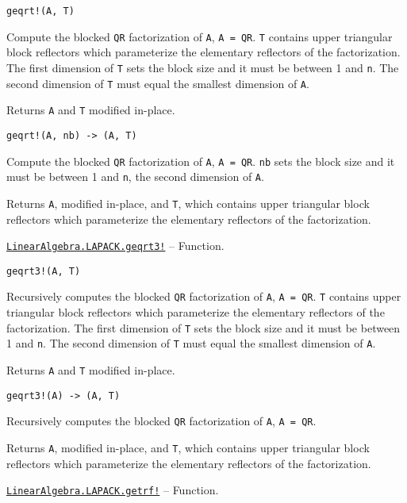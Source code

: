 \begin{adjustwidth}{2em}{0pt}


\begin{verbatim}
geqrt!(A, T)
\end{verbatim}

Compute the blocked \texttt{QR} factorization of \texttt{A}, \texttt{A = QR}. \texttt{T} contains upper triangular block reflectors which parameterize the elementary reflectors of the factorization. The first dimension of \texttt{T} sets the block size and it must be between 1 and \texttt{n}. The second dimension of \texttt{T} must equal the smallest dimension of \texttt{A}.

Returns \texttt{A} and \texttt{T} modified in-place.




\begin{lstlisting}
geqrt!(A, nb) -> (A, T)
\end{lstlisting}

Compute the blocked \texttt{QR} factorization of \texttt{A}, \texttt{A = QR}. \texttt{nb} sets the block size and it must be between 1 and \texttt{n}, the second dimension of \texttt{A}.

Returns \texttt{A}, modified in-place, and \texttt{T}, which contains upper triangular block reflectors which parameterize the elementary reflectors of the factorization.



\end{adjustwidth}
\hypertarget{12471188723051727334}{}
\hyperlink{12471188723051727334}{\texttt{LinearAlgebra.LAPACK.geqrt3!}}  -- {Function.}

\begin{adjustwidth}{2em}{0pt}


\begin{verbatim}
geqrt3!(A, T)
\end{verbatim}

Recursively computes the blocked \texttt{QR} factorization of \texttt{A}, \texttt{A = QR}. \texttt{T} contains upper triangular block reflectors which parameterize the elementary reflectors of the factorization.  The first dimension of \texttt{T} sets the block size and it must be between 1 and \texttt{n}. The second dimension of \texttt{T} must equal the smallest dimension of \texttt{A}.

Returns \texttt{A} and \texttt{T} modified in-place.




\begin{lstlisting}
geqrt3!(A) -> (A, T)
\end{lstlisting}

Recursively computes the blocked \texttt{QR} factorization of \texttt{A}, \texttt{A = QR}.

Returns \texttt{A}, modified in-place, and \texttt{T}, which contains upper triangular block reflectors which parameterize the elementary reflectors of the factorization.



\end{adjustwidth}
\hypertarget{2351778938398249720}{}
\hyperlink{2351778938398249720}{\texttt{LinearAlgebra.LAPACK.getrf!}}  -- {Function.}

